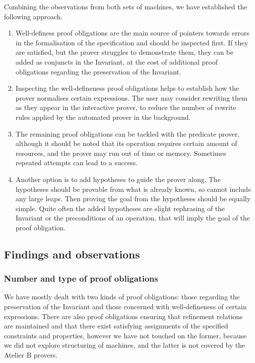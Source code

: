 \documentclass[12pt,journal,duplex]{IEEEtran}
\begin{document}
	Combining the observations from both sets of machines, we have established the following approach.
	\begin{enumerate}
		\item	Well-definess proof obligations are the main source of pointers towards errors in the formalisation of the specification and should be inspected first. If they are satisfied, but the prover struggles to demonstrate them, they can be added as conjuncts in the Invariant, at the cost of additional proof obligations regarding the preservation of the Invariant.

		\item Inspecting the well-defineness proof obligations helps to establish how the prover normalises certain expressions. The user may consider rewriting them as they appear in the interactive prover, to reduce the number of rewrite rules applied by the automated prover in the background.

		\item The remaining proof obligations can be tackled with the predicate prover, although it should be noted that its operation requires certain amount of resources, and the prover may run out of time or memory. Sometimes repeated attempts can lead to a success.

		\item Another option is to add hypotheses to guide the prover along. The hypotheses should be provable from what is already known, so cannot include any large leaps. Then proving the goal from the hypotheses should be equally simple. Quite often the added hypotheses are slight rephrasing of the Invariant or the preconditions of an operation, that will imply the goal of the proof obligation.
  \end{enumerate}

	\subsection{Findings and observations}
	\subsubsection{Number and type of proof obligations}
	We have mostly dealt with two kinds of proof obligations: those regarding the preservation of the Invariant and those concerned with well-defineness of certain expressions. There are also proof obligations ensuring that refinement relations are maintained and that there exist satisfying assignments of the specified constraints and properties\cite{Sekerinski}, however we have not touched on the former, because we did not explore structuring of machines, and the latter is not covered by the Atelier B provers.
\end{document}
